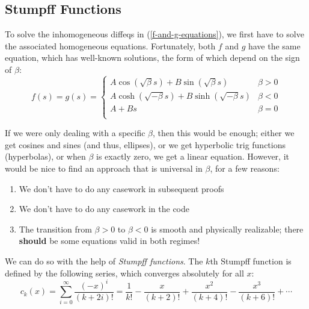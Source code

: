\documentclass{article}
\numberwithin{equation}{subsection}
\begin{document}
\subsection{Stumpff Functions}

To solve the inhomogeneous diffeqs in (\ref{f-and-g-equations}), we first have to solve the associated homogeneous equations. Fortunately, both $f$ and $g$ have the same equation, which has well-known solutions, the form of which depend on the sign of $\beta$:
\begin{equation}
\label{homogeneous-solutions}
f(s) = g(s) = \begin{cases}
A \cos(\sqrt{\beta} s) + B \sin(\sqrt{\beta} s)     & \beta > 0 \\
A \cosh(\sqrt{-\beta} s) + B \sinh(\sqrt{-\beta} s) & \beta < 0 \\
A + B s                                  & \beta = 0 \\
\end{cases}
\end{equation}

If we were only dealing with a specific $\beta$, then this would be enough; either we get cosines and sines (and thus, ellipses), or we get hyperbolic trig functions (hyperbolas), or when $\beta$ is exactly zero, we get a linear equation. However, it would be nice to find an approach that is universal in $\beta$, for a few reasons:
\begin{enumerate}
\item We don't have to do any casework in subsequent proofs
\item We don't have to do any casework in the code
\item The transition from $\beta > 0$ to $\beta < 0$ is smooth and physically realizable; there \textbf{should} be some equations valid in both regimes!
\end{enumerate}

We can do so with the help of \emph{Stumpff functions}. The $k$th Stumpff function is defined by the following series, which converges absolutely for all $x$:
\begin{equation}
c_k(x) = \sum_{i=0}^\infty \frac{(-x)^i}{(k+2i)!}
= \frac{1}{k!} - \frac{x}{(k+2)!} + \frac{x^2}{(k+4)!} - \frac{x^3}{(k+6)!} + \cdots
\end{equation}
\end{document}
